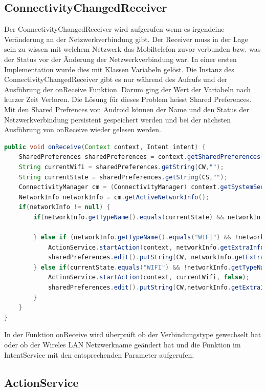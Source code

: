 \subsection{ConnectivityChangedReceiver}
Der ConnectivityChangedReceiver wird aufgerufen wenn es irgendeine Veränderung an der Netzwerkverbindung gibt. Der Receiver muss in der Lage sein zu wissen mit welchem Netzwerk das Mobiltelefon zuvor verbunden bzw. was der Status vor der Änderung der Netzwerkverbindung war. In einer ersten Implementation wurde dies mit Klassen Variabeln gelöst. Die Instanz des ConnectivityChangedReceiver gibt es nur während des Aufrufs und der Ausführung der onReceive Funktion. Darum ging der Wert der Variabeln nach kurzer Zeit Verloren. Die Lösung für dieses Problem heisst Shared Preferences. Mit den Shared Prefrences von Android können der Name und den Status der Netzwerkverbindung persistent gespeichert werden und bei der nächsten Ausführung von onReceive wieder gelesen werden.
\begin{lstlisting}[language=Java]
public void onReceive(Context context, Intent intent) {
    SharedPreferences sharedPreferences = context.getSharedPreferences("com.koki.app.wifiaction",Context.MODE_PRIVATE);
    String currentWifi = sharedPreferences.getString(CW,"");
    String currentState = sharedPreferences.getString(CS,"");
    ConnectivityManager cm = (ConnectivityManager) context.getSystemService(Context.CONNECTIVITY_SERVICE);
    NetworkInfo networkInfo = cm.getActiveNetworkInfo();
    if(networkInfo != null) {
        if(networkInfo.getTypeName().equals(currentState) && networkInfo.getExtraInfo().equals(currentWifi) ) {

        } else if (networkInfo.getTypeName().equals("WIFI") && !networkInfo.getExtraInfo().equals(currentWifi)) {
            ActionService.startAction(context, networkInfo.getExtraInfo(), true);
            sharedPreferences.edit().putString(CW, networkInfo.getExtraInfo()).putString(CS,networkInfo.getTypeName()).commit();
        } else if(currentState.equals("WIFI") && !networkInfo.getTypeName().equals("WIFI")) {
            ActionService.startAction(context, currentWifi, false);
            sharedPreferences.edit().putString(CW,networkInfo.getExtraInfo()).putString(CS,networkInfo.getTypeName()).commit();
        }
    }
}
\end{lstlisting}
In der Funktion onReceive wird überprüft ob der Verbindungstype gewechselt hat oder ob der Wireles LAN Netzwerkname geändert hat und die Funktion im IntentService mit den entsprechenden Parameter aufgerufen.

\subsection{ActionService}
